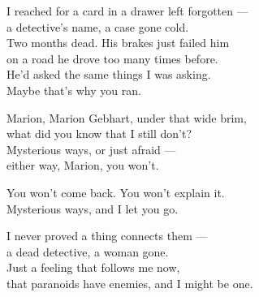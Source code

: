 \begin{lyrics}
I reached for a card in a drawer left forgotten —\\
a detective's name, a case gone cold.\\
Two months dead. His brakes just failed him\\
on a road he drove too many times before.\\
He'd asked the same things I was asking.\\
Maybe that's why you ran.

Marion, Marion Gebhart, under that wide brim,\\
what did you know that I still don't?\\
Mysterious ways, or just afraid —\\
either way, Marion, you won't.

You won't come back. You won't explain it.\\
Mysterious ways, and I let you go.

I never proved a thing connects them —\\
a dead detective, a woman gone.\\
Just a feeling that follows me now,\\
that paranoids have enemies, and I might be one.
\end{lyrics}


